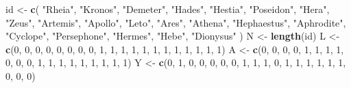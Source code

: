 \documentclass[10pt,]{book}
\newenvironment{Shaded}{\begin{snugshade}}{\end{snugshade}}
\newcommand{\DecValTok}[1]{\textcolor[rgb]{0.00,0.00,0.81}{#1}}
\newcommand{\KeywordTok}[1]{\textcolor[rgb]{0.13,0.29,0.53}{\textbf{#1}}}
\newcommand{\NormalTok}[1]{#1}
\newcommand{\StringTok}[1]{\textcolor[rgb]{0.31,0.60,0.02}{#1}}
\begin{document}
\begin{Shaded}
\begin{Highlighting}[]
\NormalTok{id <-}\StringTok{ }\KeywordTok{c}\NormalTok{(}
  \StringTok{"Rheia"}\NormalTok{,}
  \StringTok{"Kronos"}\NormalTok{,}
  \StringTok{"Demeter"}\NormalTok{,}
  \StringTok{"Hades"}\NormalTok{,}
  \StringTok{"Hestia"}\NormalTok{,}
  \StringTok{"Poseidon"}\NormalTok{,}
  \StringTok{"Hera"}\NormalTok{,}
  \StringTok{"Zeus"}\NormalTok{,}
  \StringTok{"Artemis"}\NormalTok{,}
  \StringTok{"Apollo"}\NormalTok{,}
  \StringTok{"Leto"}\NormalTok{,}
  \StringTok{"Ares"}\NormalTok{,}
  \StringTok{"Athena"}\NormalTok{,}
  \StringTok{"Hephaestus"}\NormalTok{,}
  \StringTok{"Aphrodite"}\NormalTok{,}
  \StringTok{"Cyclope"}\NormalTok{,}
  \StringTok{"Persephone"}\NormalTok{,}
  \StringTok{"Hermes"}\NormalTok{,}
  \StringTok{"Hebe"}\NormalTok{,}
  \StringTok{"Dionysus"}
\NormalTok{)}
\NormalTok{N <-}\StringTok{ }\KeywordTok{length}\NormalTok{(id)}
\NormalTok{L <-}\StringTok{ }\KeywordTok{c}\NormalTok{(}\DecValTok{0}\NormalTok{, }\DecValTok{0}\NormalTok{, }\DecValTok{0}\NormalTok{, }\DecValTok{0}\NormalTok{, }\DecValTok{0}\NormalTok{, }\DecValTok{0}\NormalTok{, }\DecValTok{0}\NormalTok{, }\DecValTok{0}\NormalTok{, }\DecValTok{1}\NormalTok{, }\DecValTok{1}\NormalTok{, }\DecValTok{1}\NormalTok{, }\DecValTok{1}\NormalTok{, }\DecValTok{1}\NormalTok{, }\DecValTok{1}\NormalTok{, }\DecValTok{1}\NormalTok{, }\DecValTok{1}\NormalTok{, }\DecValTok{1}\NormalTok{, }\DecValTok{1}\NormalTok{, }\DecValTok{1}\NormalTok{, }\DecValTok{1}\NormalTok{)}
\NormalTok{A <-}\StringTok{ }\KeywordTok{c}\NormalTok{(}\DecValTok{0}\NormalTok{, }\DecValTok{0}\NormalTok{, }\DecValTok{0}\NormalTok{, }\DecValTok{0}\NormalTok{, }\DecValTok{1}\NormalTok{, }\DecValTok{1}\NormalTok{, }\DecValTok{1}\NormalTok{, }\DecValTok{1}\NormalTok{, }\DecValTok{0}\NormalTok{, }\DecValTok{0}\NormalTok{, }\DecValTok{0}\NormalTok{, }\DecValTok{1}\NormalTok{, }\DecValTok{1}\NormalTok{, }\DecValTok{1}\NormalTok{, }\DecValTok{1}\NormalTok{, }\DecValTok{1}\NormalTok{, }\DecValTok{1}\NormalTok{, }\DecValTok{1}\NormalTok{, }\DecValTok{1}\NormalTok{, }\DecValTok{1}\NormalTok{)}
\NormalTok{Y <-}\StringTok{ }\KeywordTok{c}\NormalTok{(}\DecValTok{0}\NormalTok{, }\DecValTok{1}\NormalTok{, }\DecValTok{0}\NormalTok{, }\DecValTok{0}\NormalTok{, }\DecValTok{0}\NormalTok{, }\DecValTok{0}\NormalTok{, }\DecValTok{0}\NormalTok{, }\DecValTok{1}\NormalTok{, }\DecValTok{1}\NormalTok{, }\DecValTok{1}\NormalTok{, }\DecValTok{0}\NormalTok{, }\DecValTok{1}\NormalTok{, }\DecValTok{1}\NormalTok{, }\DecValTok{1}\NormalTok{, }\DecValTok{1}\NormalTok{, }\DecValTok{1}\NormalTok{, }\DecValTok{1}\NormalTok{, }\DecValTok{0}\NormalTok{, }\DecValTok{0}\NormalTok{, }\DecValTok{0}\NormalTok{)}

\end{Highlighting}
\end{Shaded}
\end{document}
